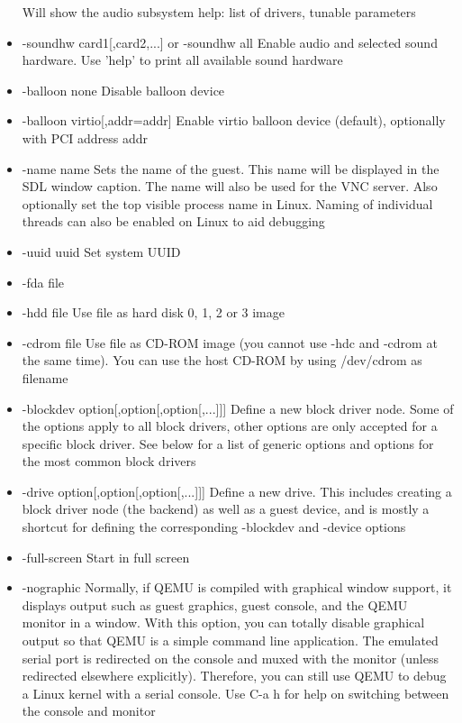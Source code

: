 \documentclass[letterpaper,10pt,fleqn]{article}
\begin{document}
\begin{itemize}
           Will show the audio subsystem help: list of drivers, tunable
           parameters
		\item-soundhw card1[,card2,...] or -soundhw all
           Enable audio and selected sound hardware. Use 'help' to print all
           available sound hardware
		\item-balloon none
           Disable balloon device
		\item-balloon virtio[,addr=addr]
           Enable virtio balloon device (default), optionally with PCI address
           addr
		\item-name name
           Sets the name of the guest.  This name will be displayed in the SDL
           window caption.  The name will also be used for the VNC server.  Also
           optionally set the top visible process name in Linux.  Naming of
           individual threads can also be enabled on Linux to aid debugging

		\item-uuid uuid
           Set system UUID

    \item-fda file
		\item-hdd file
           Use file as hard disk 0, 1, 2 or 3 image
		\item-cdrom file
           Use file as CD-ROM image (you cannot use -hdc and -cdrom at the same
           time). You can use the host CD-ROM by using /dev/cdrom as filename

		\item-blockdev option[,option[,option[,...]]]
           Define a new block driver node. Some of the options apply to all
           block drivers, other options are only accepted for a specific block
           driver. See below for a list of generic options and options for the
           most common block drivers

		\item-drive option[,option[,option[,...]]]
           Define a new drive. This includes creating a block driver node (the
           backend) as well as a guest device, and is mostly a shortcut for
           defining the corresponding -blockdev and -device options

		\item-full-screen
           Start in full screen

		\item-nographic
           Normally, if QEMU is compiled with graphical window support, it
           displays output such as guest graphics, guest console, and the QEMU
           monitor in a window. With this option, you can totally disable
           graphical output so that QEMU is a simple command line application.
           The emulated serial port is redirected on the console and muxed with
           the monitor (unless redirected elsewhere explicitly). Therefore, you
           can still use QEMU to debug a Linux kernel with a serial console. Use
           C-a h for help on switching between the console and monitor


\end{itemize}
\end{document}
